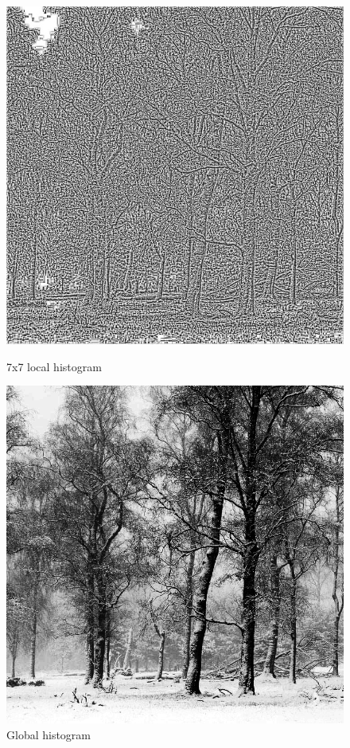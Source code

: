 \documentclass{article}
\begin{document}
\begin{figure}[!htb]
    \centering
    \begin{minipage}[b]{0.45\textwidth}
        \includegraphics[width=\textwidth]{LC2_local_7.jpg}
        \caption{7x7 local histogram}
    \end{minipage}
    \begin{minipage}[b]{0.45\textwidth}
        \includegraphics[width=\textwidth]{LC2_global.png}
        \caption{Global histogram}
    \end{minipage}
\end{figure}
\end{document}
